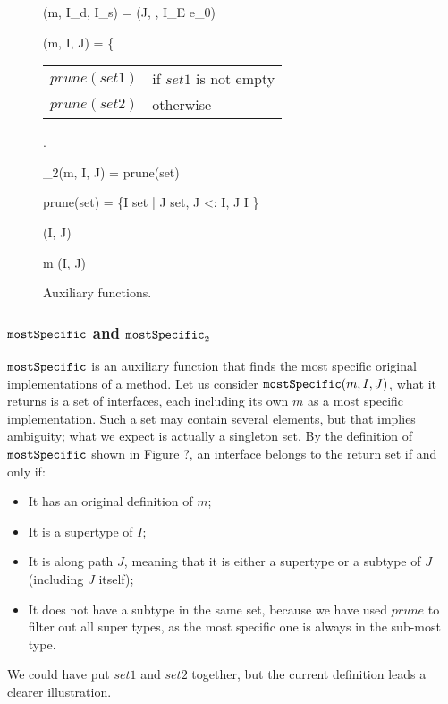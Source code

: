 \begin{figure*}[t]
	\begin{mathpar}
		{\mbody(m, I_d, I_s) = (J,  \; , I_E \; e_0)}
	
	{\mostSpecific(m, I, J) = \left\{{\begin{tabular}{ll}
				$prune(set1)$ & if $set1$ is not empty \\ $prune(set2)$ & otherwise
			\end{tabular}}\right.}
	
		{\mostSpecific_2(m, I, J) = prune(set)}
	
	prune(set) = \{I \in set \; | \; \nexists J \in set, J <: I, J \neq I \}
	
	{\ext(I, J)}
	
	{m \in \updateSet(I, J)}
	\end{mathpar}
	\caption{Auxiliary functions.}\label{fig:auxfunc}
\end{figure*}

\subsubsection{$\texttt{mostSpecific}$ and $\texttt{mostSpecific}_2$}

$\texttt{mostSpecific}$ is an auxiliary function that finds the most specific original implementations of a method. Let us consider $\texttt{mostSpecific}(m, I, J)$, what it returns is a set of interfaces, each including its own $m$ as a most specific implementation. Such a set may contain several elements, but that implies ambiguity; what we expect is actually a singleton set. By the definition of $\texttt{mostSpecific}$ shown in Figure ?, an interface belongs to the return set if and only if:
\begin{itemize}
	\item It has an original definition of $m$;
	\item It is a supertype of $I$;
	\item It is along path $J$, meaning that it is either a supertype or a subtype of $J$ (including $J$ itself);
	\item It does not have a subtype in the same set, because we have used $prune$ to filter out all super types, as the most specific one is always in the sub-most type.
\end{itemize}
We could have put $set1$ and $set2$ together, but the current definition leads a clearer illustration.

